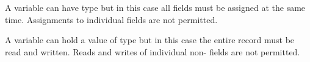A  variable can have  type but in this case
all fields must be assigned at the same time. Assignments to
individual fields are not permitted.

A  variable can hold a value of  type but in
this case the entire record must be read and written. Reads and writes
of individual non- fields are not permitted.


